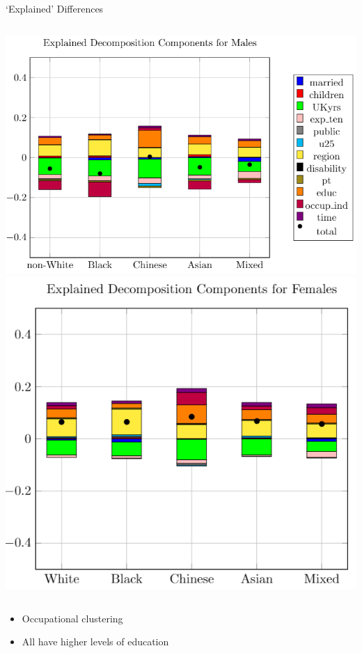\documentclass[aspectratio=169,12pt]{beamer}
\begin{document}
\begin{frame}{\enquote*{Explained} Differences}
\vspace{-10pt}
    \begin{columns}
        \vspace{5pt}
		\includegraphics[width=\textwidth]{beamer/male_explained_pic}
	    \vspace{5pt}
		\includegraphics[width=\textwidth]{beamer/female_explained_pic.png}
	\end{columns}
	\vspace{-5pt}
	\begin{itemize}
	    \item Occupational clustering
	    \item All have higher levels of education
	\end{itemize}
\end{frame}
\end{document}
